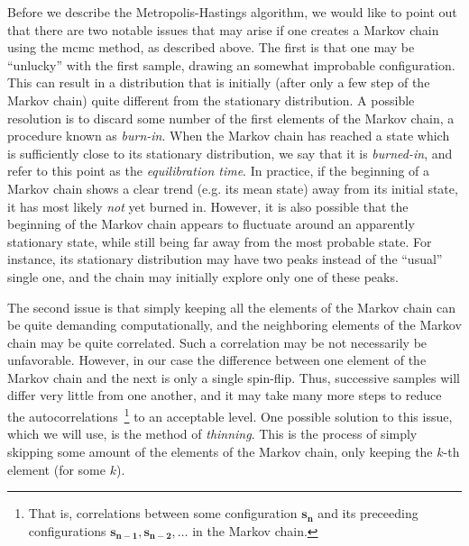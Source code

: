 \documentclass[english,notitlepage,reprint]{revtex4-2}  %
\renewcommand{\vec}[1]{\mathbf{#1}}
\begin{document}
Before we describe the Metropolis-Hastings algorithm, we would like to point out that there are two notable issues that may arise if one creates a Markov chain using the \gls{mcmc} method, as described above. 
The first is that one may be ``unlucky'' with the first sample, drawing an somewhat improbable configuration.
This can result in a distribution that is initially (after only a few step of the Markov chain) quite different from the stationary distribution. 
A possible resolution is to discard some number of the first elements of the Markov chain, a procedure known as \emph{burn-in}.
When the Markov chain has reached a state which is sufficiently close to its stationary distribution, we say that it is \emph{burned-in}, and refer to this point as the \emph{equilibration time}.  
In practice, if the beginning of a Markov chain shows a clear trend (e.g. its mean state) away from its initial state, it has most likely \emph{not} yet burned in. 
However, it is also possible that the beginning of the Markov chain appears to fluctuate around an apparently stationary state, while still being far away from the most probable state. 
For instance, its stationary distribution may have two peaks instead of the ``usual'' single one, and the chain may initially explore only one of these peaks.

The second issue is that simply keeping all the elements of the Markov chain can be quite demanding computationally, and the neighboring elements of the Markov chain may be quite correlated.
Such a correlation may be not necessarily be unfavorable. 
However, in our case the difference between one element of the Markov chain and the next is only a single spin-flip. 
Thus, successive samples will differ very little from one another, and it may take many more steps to reduce the autocorrelations~\footnote{That is, correlations between some configuration $\vec{s_n}$ and its preceeding configurations $\vec{s_{n-1}}, \vec{s_{n-2}}, \dots$ in the Markov chain.} to an acceptable level.
One possible solution to this issue, which we will use, is the method of \emph{thinning}. 
This is the process of simply skipping some amount of the elements of the Markov chain, only keeping the \(k\)-th element (for some \(k\)).
\end{document}
